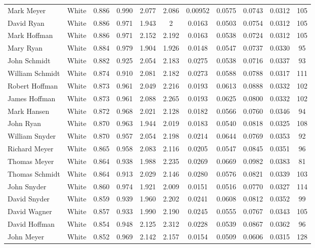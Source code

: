 \documentclass[]{article}
\begin{document}
\begin{tabular}{lcccccccccc}
Mark Meyer & White & 0.886 & 0.990 & 2.077 & 2.086 & 0.00952 & 0.0575 & 0.0743 & 0.0312 & 105 \\
David Ryan & White & 0.886 & 0.971 & 1.943 & 2 & 0.0163 & 0.0503 & 0.0754 & 0.0312 & 105 \\
Mark Hoffman & White & 0.886 & 0.971 & 2.152 & 2.192 & 0.0163 & 0.0538 & 0.0724 & 0.0312 & 105 \\
Mary Ryan & White & 0.884 & 0.979 & 1.904 & 1.926 & 0.0148 & 0.0547 & 0.0737 & 0.0330 & 95 \\
John Schmidt & White & 0.882 & 0.925 & 2.054 & 2.183 & 0.0275 & 0.0538 & 0.0716 & 0.0337 & 93 \\
William Schmidt & White & 0.874 & 0.910 & 2.081 & 2.182 & 0.0273 & 0.0588 & 0.0788 & 0.0317 & 111 \\
Robert Hoffman & White & 0.873 & 0.961 & 2.049 & 2.216 & 0.0193 & 0.0613 & 0.0888 & 0.0332 & 102 \\
James Hoffman & White & 0.873 & 0.961 & 2.088 & 2.265 & 0.0193 & 0.0625 & 0.0800 & 0.0332 & 102 \\
Mark Hansen & White & 0.872 & 0.968 & 2.021 & 2.128 & 0.0182 & 0.0566 & 0.0760 & 0.0346 & 94 \\
John Ryan & White & 0.870 & 0.963 & 1.944 & 2.019 & 0.0183 & 0.0540 & 0.0818 & 0.0325 & 108 \\
William Snyder & White & 0.870 & 0.957 & 2.054 & 2.198 & 0.0214 & 0.0644 & 0.0769 & 0.0353 & 92 \\
Richard Meyer & White & 0.865 & 0.958 & 2.083 & 2.116 & 0.0205 & 0.0547 & 0.0845 & 0.0351 & 96 \\
Thomas Meyer & White & 0.864 & 0.938 & 1.988 & 2.235 & 0.0269 & 0.0669 & 0.0982 & 0.0383 & 81 \\
Thomas Schmidt & White & 0.864 & 0.913 & 2.029 & 2.146 & 0.0280 & 0.0576 & 0.0821 & 0.0339 & 103 \\
John Snyder & White & 0.860 & 0.974 & 1.921 & 2.009 & 0.0151 & 0.0516 & 0.0770 & 0.0327 & 114 \\
David Snyder & White & 0.859 & 0.939 & 1.960 & 2.202 & 0.0241 & 0.0608 & 0.0812 & 0.0352 & 99 \\
David Wagner & White & 0.857 & 0.933 & 1.990 & 2.190 & 0.0245 & 0.0555 & 0.0767 & 0.0343 & 105 \\
David Hoffman & White & 0.854 & 0.948 & 2.125 & 2.312 & 0.0228 & 0.0539 & 0.0867 & 0.0362 & 96 \\
John Meyer & White & 0.852 & 0.969 & 2.142 & 2.157 & 0.0154 & 0.0509 & 0.0606 & 0.0315 & 128 \\

\end{tabular}
\end{document}
